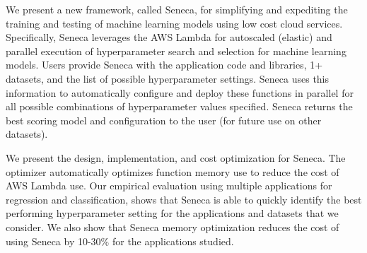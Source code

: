 
We present a new framework, called Seneca, for simplifying and expediting
the training and testing of machine learning models
using low cost cloud services.
Specifically, Seneca leverages the AWS Lambda for autoscaled
(elastic) and parallel execution of hyperparameter search 
and selection for machine learning models.  
Users provide Seneca with the application code and 
libraries, 1+ datasets, and the list 
of possible hyperparameter settings.  
Seneca uses this information to automatically
configure and deploy these functions in parallel for all possible 
combinations of hyperparameter values specified. Seneca
returns the best scoring model
and configuration to the user (for future use on other datasets).

We present the design, implementation, and cost optimization for Seneca.
The optimizer automatically optimizes function memory use to reduce the cost
of AWS Lambda use.  Our empirical evaluation using
multiple applications for regression and classification,
shows that Seneca is able to quickly
identify the best performing hyperparameter setting 
for the applications and datasets that we consider.  
We also show that Seneca memory optimization reduces the cost of using
Seneca by 10-30\% for the applications studied.


